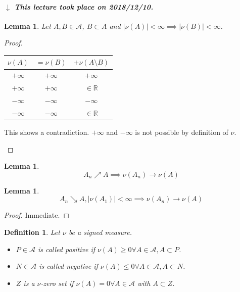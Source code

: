 \documentclass[a4paper]{article}
\newcounter{lecref}[section]
\numberwithin{lecref}{section}
\theoremstyle{break}
\newtheorem{definition}[lecref]{Definition}
\newtheorem{lemma}[lecref]{Lemma}
\newcommand{\dateref}[1]{%
  \begin{mdframed}[backgroundcolor=gray!10,innerbottommargin=0pt,innertopmargin=0pt]
    \paragraph{\textit{$\downarrow$ This lecture took place on #1.}}%
  \end{mdframed}%
}
\newcommand{\Abs}[1]{\left|#1\right|}
\begin{document}
\dateref{2018/12/10}

\begin{lemma}
  Let $A, B \in \mathcal A$, $B \subset A$ and $\Abs{\nu(A)} < \infty \implies \Abs{\nu(B)} < \infty$.
\end{lemma}

\begin{proof}
  \begin{center}
    \begin{tabular}{c|cc}
      $\nu(A)$  &$= \nu(B)$ &$+ \nu(A \setminus B)$ \\
    \hline
      $+\infty$ & $+\infty$ & $+ \infty$ \\
      $+\infty$ & $+\infty$ & $\in \mathbb R$ \\
      $-\infty$ & $-\infty$ & $-\infty$ \\
      $-\infty$ & $-\infty$ & $\in \mathbb R$
    \end{tabular}

    This shows a contradiction.
    $+\infty$ and $-\infty$ is not possible by definition of $\nu$.
  \end{center}
\end{proof}

\begin{lemma}
  \[ A_n \nearrow A \implies \nu(A_n) \to \nu(A) \]
\end{lemma}

\begin{lemma}
  \[ A_n \searrow A, \Abs{\nu(A_1)} < \infty \implies \nu(A_n) \to \nu(A) \]
\end{lemma}

\begin{proof}
  Immediate.
\end{proof}

\begin{definition}
  Let $\nu$ be a signed measure.
  \begin{itemize}
    \item $P \in \mathcal A$ is called positive if $\nu(A) \geq 0 \forall A \in \mathcal A, A \subset P$.
    \item $N \in \mathcal A$ is called negative if $\nu(A) \leq 0 \forall A \in \mathcal A, A \subset N$.
    \item $Z$ is a $\nu$-zero set if $\nu(A) = 0 \forall A \in \mathcal A$ with $A \subset Z$.
  \end{itemize}
\end{definition}
\end{document}
